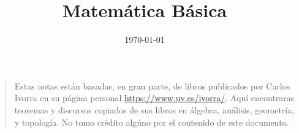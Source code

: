 \documentclass[article,oneside,10pt]{memoir}
\theoremstyle{plain}
\theoremstyle{definition}
\begin{document}
\author{\href{mailto:\authoremail}{\documentauthor}}
\title{Matemática Básica}
\date{\today}

\maketitle
\tableofcontents

\begin{quote}
Estas notas están basadas, en gran parte, de libros publicados por Carlos
Ivorra en su página personal \url{https://www.uv.es/ivorra/}. Aquí
encontraras teoremas y discursos copiados de sus libros en álgebra,
análisis, geometría, y topología. No tomo crédito algúno por el contenido
de este documento.
\end{quote}

% 


% 

% 
\end{document}
